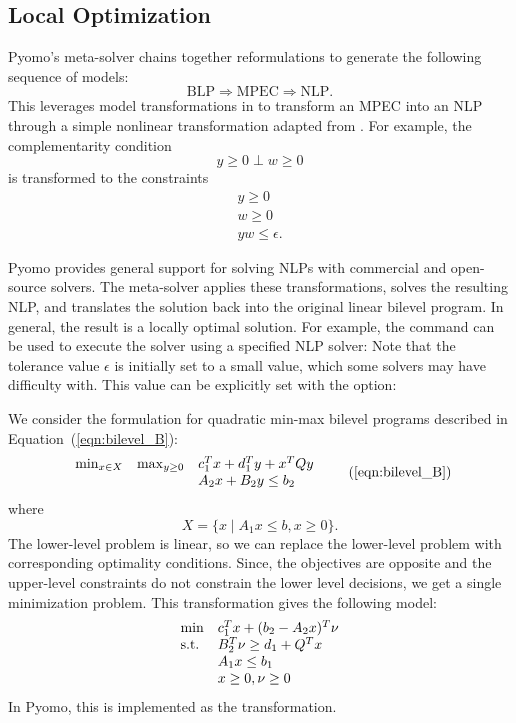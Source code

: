 \subsection{Local Optimization}

Pyomo's  meta-solver chains together reformulations to generate the
following sequence of models:
\[
\textrm{BLP} \Rightarrow \textrm{MPEC} \Rightarrow \textrm{NLP}.
\]
This leverages model transformations in  to transform an MPEC into an NLP through a simple nonlinear transformation adapted from \citet{FerDirMee05}.  For example, the complementarity condition
\[
y \geq 0 \perp w \geq 0
\]
is transformed to the constraints
\[
\begin{array}{l}
y \geq 0\\
w \geq 0\\
y w \leq \epsilon .
\end{array}
\]

Pyomo provides general support for solving NLPs with commercial and
open-source solvers.  The  meta-solver
applies these transformations, solves the resulting NLP, and
translates the solution back into the original linear bilevel
program.  In general, the result is a locally optimal solution.
For example, the  command can be used to execute the
 solver using a specified NLP solver:
Note that the tolerance value $\epsilon$ is initially set to a small
value, which some solvers may have difficulty with.  This value can
be explicitly set with the  option:



\label{sec:QMM}

We consider the formulation for quadratic min-max bilevel programs
described in Equation~(\ref{eqn:bilevel_B}):
\begin{equation}
\begin{array}{lll}
\min_{x \in X} & \max_{y \geq 0} & c^T_1 x + d^T_1 y + x^T Q y\\
& & A_2 x + B_2 y \leq b_2
\end{array}
\tag{\ref{eqn:bilevel_B}}
\end{equation}
where
\[
X = \{ x \mid A_1 x \leq b, x \geq 0\}.
\]
The lower-level problem
is linear, so we can replace the lower-level problem with corresponding
optimality conditions.  Since, the objectives are opposite and the
upper-level constraints do not constrain the lower level decisions,
we get a single minimization problem.  This transformation gives
the following model:
\begin{equation}
\label{eqn:bilevel_B_xfrm}
\begin{array}{ll}
\min & c^T_1 x + (b_2 - A_2 x)^T \nu\\
\textrm{s.t.}  & B^T_2 \nu \geq d_1 + Q^T x\\
     & A_1 x \leq b_1\\
     & x \geq 0, \nu \geq 0
\end{array}
\end{equation}
In Pyomo, this is implemented as the  transformation.


